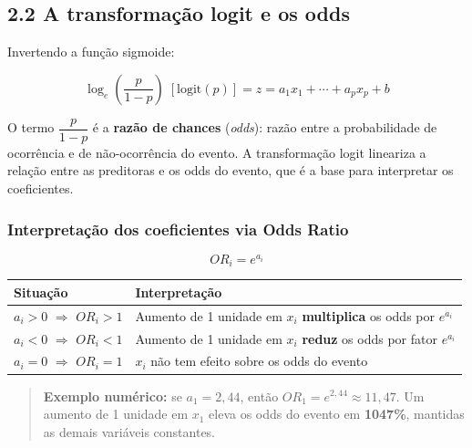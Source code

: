 \documentclass[
  letterpaper,
  DIV=11,
  numbers=noendperiod]{scrartcl}
\newcounter{none} %
\begin{document}
\subsection{2.2 A transformação logit e os
odds}\label{a-transformauxe7uxe3o-logit-e-os-odds}

Invertendo a função sigmoide:

\[\log_e\!\left(\frac{p}{1-p}\right) \; [\text{logit}(p)] = z = a_1 x_1 + \cdots + a_p x_p + b\]

O termo \(\dfrac{p}{1-p}\) é a \textbf{razão de chances} (\emph{odds}):
razão entre a probabilidade de ocorrência e de não-ocorrência do evento.
A transformação logit lineariza a relação entre as preditoras e os odds
do evento, que é a base para interpretar os coeficientes.

\subsubsection{Interpretação dos coeficientes via Odds
Ratio}\label{interpretauxe7uxe3o-dos-coeficientes-via-odds-ratio}

\[OR_i = e^{a_i}\]

{\def\LTcaptype{none} %
\begin{longtable}[]{@{}
  >{\raggedright\arraybackslash}p{}
  >{\raggedright\arraybackslash}p{}@{}}
\toprule\noalign{}
\begin{minipage}[b]{\linewidth}\raggedright
Situação
\end{minipage} & \begin{minipage}[b]{\linewidth}\raggedright
Interpretação
\end{minipage} \\
\midrule\noalign{}
\endhead
\bottomrule\noalign{}
\endlastfoot
\(a_i > 0\) \(\Rightarrow\) \(OR_i > 1\) & Aumento de 1 unidade em
\(x_i\) \textbf{multiplica} os odds por \(e^{a_i}\) \\
\(a_i < 0\) \(\Rightarrow\) \(OR_i < 1\) & Aumento de 1 unidade em
\(x_i\) \textbf{reduz} os odds por fator \(e^{a_i}\) \\
\(a_i = 0\) \(\Rightarrow\) \(OR_i = 1\) & \(x_i\) não tem efeito sobre
os odds do evento \\
\end{longtable}
}

\begin{quote}
\textbf{Exemplo numérico:} se \(a_1 = 2{,}44\), então
\(OR_1 = e^{2,44} \approx 11{,}47\). Um aumento de 1 unidade em \(x_1\)
eleva os odds do evento em \textbf{1047\%}, mantidas as demais variáveis
constantes.
\end{quote}
\end{document}
